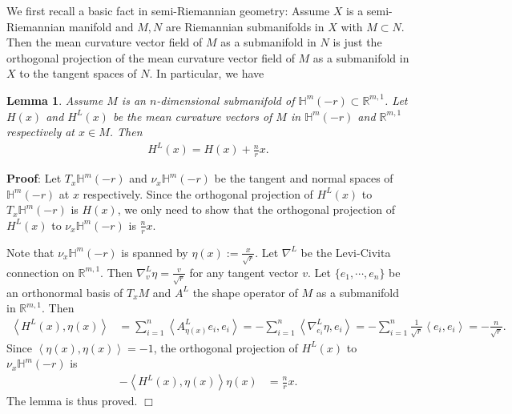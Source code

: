 \documentclass[12pt]{article}
\newtheorem{lem}{Lemma}[section]
\begin{document}
We first recall a basic fact in semi-Riemannian geometry:
Assume $X$ is a semi-Riemannian  manifold and  $M, N$  are Riemannian submanifolds in $X$
with $M \subset N$.
Then the mean curvature vector field of $M$ as a submanifold in $N$ is just the orthogonal projection
of the mean curvature vector field of $M$ as a submanifold in $X$ to the tangent spaces of $N$.
In particular, we have
\begin{lem} \label{4.1}
		Assume $M$ is an $n$-dimensional submanifold of $\mathbb{H}^{m}(-r) \subset \mathbb R^{m,1}$. Let $H(x)$ and  $H^L(x)$  be the mean curvature vectors of $M$ in $\mathbb{H}^{m}(-r)$ and  $\mathbb R^{m,1}$ respectively at $x \in M$. Then
	\begin{align*}
		H^L(x) = H(x) + \frac{n}{r}x.
	\end{align*}
\end{lem}
\noindent
{\bf Proof}:
Let $T_x \mathbb{H}^{m}(-r)$ and $\nu_x \mathbb{H}^{m}(-r)$ be the tangent and normal spaces of $\mathbb{H}^{m}(-r)$ at $x$ respectively.
Since the orthogonal projection of $H^L(x)$ to $T_x \mathbb{H}^{m}(-r)$ is $H(x)$, we only need to show that the orthogonal
projection of  $H^L(x)$ to $\nu_x \mathbb{H}^{m}(-r)$  is $\frac{n}{r}x$.

Note that $\nu_x \mathbb{H}^{m}(-r)$ is spanned by
$\eta(x):=\frac{x}{\sqrt{r}}$.
Let $\nabla^{L} $ be the Levi-Civita connection on  $\mathbb R^{m,1}$.
Then $\nabla^{L}_v \eta = \frac{v}{\sqrt{r}}$ for any tangent vector $v$.
Let $\{e_1,\cdots,e_n\}$ be an orthonormal basis of $T_x M$ and $A^{L}$ the shape operator
of $M$ as a submanifold in $\mathbb R^{m,1}$. Then
\begin{align*}
		 	\left<H^{L}(x), \eta(x)\right>
		 	      &=\sum_{i=1}^n \left<A^{L}_{\eta(x)}e_i,e_i\right>
		 	       =-\sum_{i=1}^n\left<\nabla^L_{e_i}\eta, e_i\right>
		 	       =-\sum_{i=1}^n \frac{1}{\sqrt{r}} \left<e_i,e_i\right>
		 	       =-\frac{n}{\sqrt{r}}.
\end{align*}
Since $\left< \eta(x), \eta(x) \right> = -1$, the orthogonal projection of $H^{L}(x)$ to
$\nu_x \mathbb{H}^{m}(-r)$ is
		 \begin{align*}
			- \left<H^{L}(x), \eta(x)\right>\eta(x)
			    &= \frac{n}{r}x.
		\end{align*}
The lemma is thus proved. $\Box$

		
	
\end{document}

